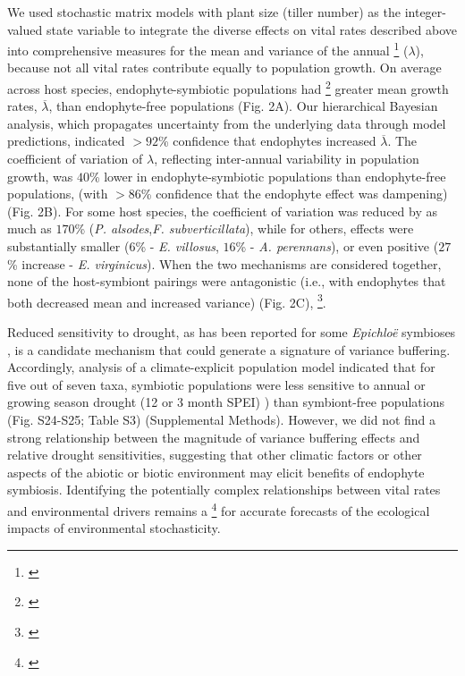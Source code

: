 \documentclass[12pt]{article}
\newcommand{\tom}[2]{{\color{red}{#1}}\footnote{\textit{\color{red}{#2}}}}
\begin{document}
We used stochastic matrix models with plant size (tiller number) as the integer-valued state variable to integrate the diverse effects on vital rates described above into comprehensive measures for the mean and variance of the annual \tom{population growth rate}{I think there is some strategy regarding whether we call this fitness or population growth. These are not realized population growth rates, and that may get us into some trouble.} ($\lambda$), because not all vital rates contribute equally to population growth.
On average across host species, endophyte-symbiotic populations had \tom{$9$\%}{would like to discuss} greater mean growth rates, $\overline{\lambda}$, than endophyte-free populations (Fig. 2A). 
Our hierarchical Bayesian analysis, which propagates uncertainty from the underlying data through model predictions, indicated $>92$\% confidence that endophytes increased $\overline{\lambda}$.
The coefficient of variation of $\lambda$, reflecting inter-annual variability in population growth, was $40$\% lower in endophyte-symbiotic populations than endophyte-free populations, (with $>86$\% confidence that the endophyte effect was dampening) (Fig. 2B).
For some host species, the coefficient of variation was reduced by as much as $170$\% (\emph{P. alsodes},\emph{F. subverticillata}), while for others, effects were substantially smaller ($6$\% - \emph{E. villosus}, $16$\% - \emph{A. perennans}), or even positive ($27$\% increase - \emph{E. virginicus}).
When the two mechanisms are considered together, none of the host-symbiont pairings were antagonistic (i.e., with endophytes that both decreased mean and increased variance) (Fig. 2C), \tom{suggesting that variation the across host species in mean and variance effects may reflect alternative life history strategies that yield similar benefits of endophyte symbiosis}{This seems to tie directly to the life history trait analysis, which is why I think this is the most natural place for those results}. 

Reduced sensitivity to drought, as has been reported for some \emph{Epichlo\"{e}} symbioses \cite{decunta2021systematic}, is a candidate mechanism that could generate a signature of variance buffering.
Accordingly, analysis of a climate-explicit population model indicated that for five out of seven taxa, symbiotic populations were less sensitive to annual or growing season drought (12 or 3 month SPEI) \cite{vicente2010multiscalar}) than symbiont-free populations (Fig. S24-S25; Table S3) (Supplemental Methods).
However, we did not find a strong relationship between the magnitude of variance buffering effects and relative drought sensitivities, suggesting that other climatic factors or other aspects of the abiotic or biotic environment may elicit benefits of endophyte symbiosis. 
Identifying the potentially complex relationships between vital rates and environmental drivers remains a \tom{key challenge}{I think there is an Ehrlen-Morris paper you could cite here.} for accurate forecasts of the ecological impacts of environmental stochasticity.
\end{document}
